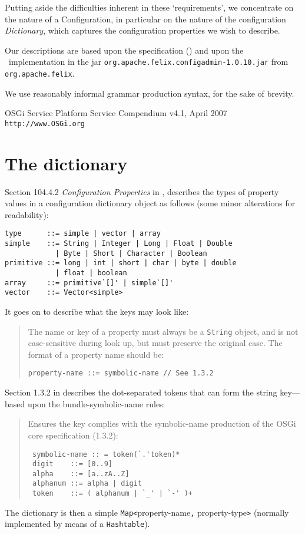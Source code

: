 \documentclass[a4paper,twoside,12pt]{article}
\begin{document}
Putting aside the difficulties inherent in these `requirements', we concentrate on the nature of a Configuration, in particular on the nature of the configuration \emph{Dictionary}, which captures the configuration properties we wish to describe.

Our descriptions are based upon the specification (\cite{OSGi}) and upon the
\felix~implementation
in the jar {\tt org.apache.felix.configadmin-1.0.10.jar} from {\tt org.apache.felix}.

We use reasonably informal grammar production syntax, for the sake of brevity.

\begin{thebibliography}{99}
     OSGi Service Platform Service Compendium v4.1, April 2007 {\tt http://www.OSGi.org}
\end{thebibliography}

\section{The dictionary}
Section 104.4.2 {\it Configuration Properties} in \cite{OSGi}, describes the types of property values in a configuration dictionary object as follows
(some minor alterations for readability):
\begin{verbatim}
type      ::= simple | vector | array 
simple    ::= String | Integer | Long | Float | Double 
            | Byte | Short | Character | Boolean 
primitive ::= long | int | short | char | byte | double 
            | float | boolean 
array     ::= primitive`[]' | simple`[]' 
vector    ::= Vector<simple> 
\end{verbatim}
It goes on to describe what the keys may look like:
\begin{quote}
The name or key of a property must always be a \texttt{String} object, and is not 
case-sensitive during look up, but must preserve the original case. The format of a property name should be:
\begin{verbatim}
property-name ::= symbolic-name // See 1.3.2
\end{verbatim}
\end{quote}
Section 1.3.2 in \cite{OSGi} describes the dot-separated tokens that can form the string key---based upon the bundle-symbolic-name 
rules:
\begin{quote}
Ensures the key complies with the symbolic-name production of the OSGi core specification (1.3.2):
\begin{verbatim}
 symbolic-name :: = token(`.'token)*
 digit    ::= [0..9]
 alpha    ::= [a..zA..Z]
 alphanum ::= alpha | digit
 token    ::= ( alphanum | `_' | `-' )+
\end{verbatim}
\end{quote}
The dictionary is then a simple \texttt{Map<}\textsf{property-name}\texttt{,} \textsf{property-type}\texttt{>} (normally implemented by means of a \texttt{Hashtable}).
\end{document}
